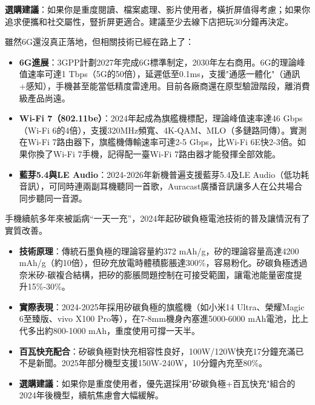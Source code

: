 \textbf{選購建議}：如果你是重度閱讀、檔案處理、影片使用者，橫折屏值得考慮；如果你追求便攜和社交屬性，豎折屏更適合。建議至少去線下店把玩30分鐘再決定。


雖然6G還沒真正落地，但相關技術已經在路上了：

\begin{itemize}
  \item \textbf{6G進展}：3GPP計劃2027年完成6G標準制定，2030年左右商用。6G的理論峰值速率可達1 Tbps（5G的50倍），延遲低至0.1ms，支援"通感一體化"（通訊+感知），手機甚至能當低精度雷達用。目前各廠商還在原型驗證階段，離消費級產品尚遠。
  \item \textbf{Wi-Fi 7（802.11be）}：2024年起成為旗艦機標配，理論峰值速率達46 Gbps（Wi-Fi 6的4倍），支援320MHz頻寬、4K-QAM、MLO（多鏈路同傳）。實測在Wi-Fi 7路由器下，旗艦機傳輸速率可達2-5 Gbps，比Wi-Fi 6E快2-3倍。如果你換了Wi-Fi 7手機，記得配一臺Wi-Fi 7路由器才能發揮全部效能。
  \item \textbf{藍芽5.4與LE Audio}：2024-2026年新機普遍支援藍芽5.4及LE Audio（低功耗音訊），可同時連兩副耳機聽同一首歌，Auracast廣播音訊讓多人在公共場合同步聽同一音源。
\end{itemize}


手機續航多年來被詬病“一天一充”，2024年起矽碳負極電池技術的普及讓情況有了實質改善。

\begin{itemize}
  \item \textbf{技術原理}：傳統石墨負極的理論容量約372 mAh/g，矽的理論容量高達4200 mAh/g（約10倍），但矽充放電時體積膨脹達300\%，容易粉化。矽碳負極透過奈米矽-碳複合結構，把矽的膨脹問題控制在可接受範圍，讓電池能量密度提升15\%-30\%。
  \item \textbf{實際表現}：2024-2025年採用矽碳負極的旗艦機（如小米14 Ultra、榮耀Magic 6至臻版、vivo X100 Pro等），在7-8mm機身內塞進5000-6000 mAh電池，比上代多出約800-1000 mAh，重度使用可撐一天半。
  \item \textbf{百瓦快充配合}：矽碳負極對快充相容性良好，100W/120W快充17分鐘充滿已不是新聞。2025年部分機型支援150W-240W，10分鐘內充至80\%。
  \item \textbf{選購建議}：如果你是重度使用者，優先選採用"矽碳負極+百瓦快充"組合的2024年後機型，續航焦慮會大幅緩解。
\end{itemize}


